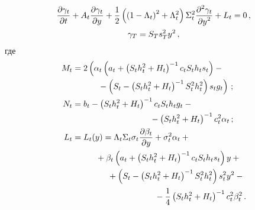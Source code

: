\begin{multicols}{2}
     \vspace*{-12pt}
     
     \noindent
     \begin{multline}
     \displaystyle\frac{\displaystyle \partial \gamma_t\mathstrut}{\displaystyle \partial t\mathstrut}+A_t\displaystyle\frac{\displaystyle \partial \gamma_t\mathstrut}{\displaystyle \partial y\mathstrut} 
+\displaystyle\frac{\displaystyle 1\mathstrut}{\displaystyle 2\mathstrut}\left( \left(1- \Lambda_t\right)^2 +\Lambda_t^2\right) \Sigma_t^2 
\displaystyle\frac{\displaystyle \partial^2 \gamma_t\mathstrut}{\displaystyle \partial y^2\mathstrut}+L_t=0\,,\\
     \gamma_T=S_T s_T^2 y^2\,,
     \label{e11-bos}
\end{multline}
где
\begin{align*}
M_t&=2\left(\alpha_t\left( a_t+\left( S_t h_t^2+H_t\right)^{-1} c_t S_t h_t s_t\right) 
- {}\right.\\
&\hspace*{10mm}\left.{}-
\left( S_t -\left( S_t h_t^2+H_t\right)^{-1} S_t^2 h_t^2\right) s_t g_t\right)\,;
\\
N_t&=b_t-\left( S_t h_t^2 +H_t\right)^{-1} c_t S_t h_t g_t -{}\\
&\hspace*{33mm}{}-\left( S_t 
h_t^2+H_t\right)^{-1} c_t^2 \alpha_t\,;\\
L_t&= L_t(y)=\Lambda_t \Sigma_t\sigma_t \fr{\partial\beta_t}{\partial y} 
+\sigma_t^2\alpha_t +{}\\
&\hspace*{10mm}{}+\beta_t\left(  a_t +\left( S_t h_t^2+H_t\right)^{-1} c_t S_t h_t s_t\right) y+{}\\
&\hspace*{15mm}{}+ \left( S_t- \left( S_t h_t^2+H_t\right)^{-1} S_t^2 h_t^2\right)s_t^2 y^2-{}\\
&\hspace*{35mm}{}-\fr{1}{4}\left( 
S_t h_t^2 +H_t\right)^{-1} c_t^2 \beta_t^2\,.
\end{align*}
     

\end{multicols}
